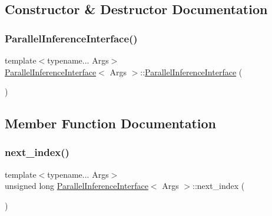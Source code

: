 \subsection{Constructor \& Destructor Documentation}
\mbox{\label{class_parallel_inference_interface_a59989833c3d7fde08746087b29c7dcef}} 
\subsubsection{\texorpdfstring{Parallel\+Inference\+Interface()}{ParallelInferenceInterface()}}
{\footnotesize\ttfamily template$<$typename... Args$>$ \\
\hyperlink{class_parallel_inference_interface}{Parallel\+Inference\+Interface}$<$ Args $>$\+::\hyperlink{class_parallel_inference_interface}{Parallel\+Inference\+Interface} (\begin{DoxyParamCaption}{ }\end{DoxyParamCaption})\hspace{0.3cm}{\ttfamily [inline]}}



\subsection{Member Function Documentation}
\mbox{\label{class_parallel_inference_interface_aaa1fe948131956b21a89c8c267e46b6c}} 
\subsubsection{\texorpdfstring{next\+\_\+index()}{next\_index()}}
{\footnotesize\ttfamily template$<$typename... Args$>$ \\
unsigned long \hyperlink{class_parallel_inference_interface}{Parallel\+Inference\+Interface}$<$ Args $>$\+::next\+\_\+index (\begin{DoxyParamCaption}{ }\end{DoxyParamCaption})\hspace{0.3cm}{\ttfamily [inline]}}



